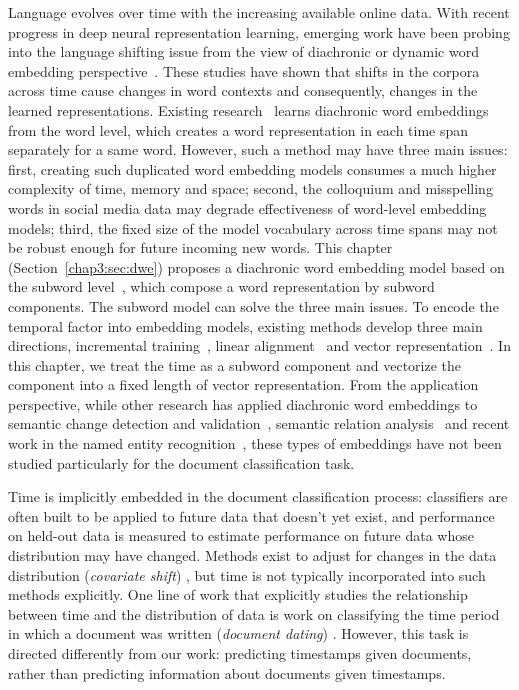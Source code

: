 Language evolves over time with the increasing available online data. 
With recent progress in deep neural representation learning, emerging work have been probing into the language shifting issue from the view of diachronic or dynamic word embedding perspective~\cite{tang2018state, kutuzov2018diachronic}.
These studies have shown that shifts in the corpora across time cause changes in word contexts and consequently, changes in the learned representations. 
Existing research~\cite{kim2014temporal, hamilton2016diachronic, yao2018dynamic, kutuzov2018diachronic} learns diachronic word embeddings from the word level, which creates a word representation in each time span separately for a same word. However, such a method may have three main issues: first, creating such duplicated word embedding models consumes a much higher complexity of time, memory and space; second, the colloquium and misspelling words in social media data may degrade effectiveness of word-level embedding models; third, the fixed size of the model vocabulary across time spans may not be robust enough for future incoming new words.
This chapter (Section~\ref{chap3:sec:dwe}) proposes a diachronic word embedding model based on the subword level~\cite{huang2019neural}, which compose a word representation by subword components. The subword model can solve the three main issues.
To encode the temporal factor into embedding models, existing methods develop three main directions, incremental training~\cite{kim2014temporal}, linear alignment~\cite{kulkarni2015statistically, hamilton2016diachronic} and vector representation~\cite{rosenfeld2018deep, huang2019neural}.
In this chapter, we treat the time as a subword component and vectorize the component into a fixed length of vector representation.
From the application perspective, while other research has applied diachronic word embeddings to semantic change detection and validation~\cite{mihalcea2012word, kim2014temporal, kulkarni2015statistically, hamilton2016diachronic, dubossarsky2017outta, yao2018dynamic, rudolph2018dynamic, rosenfeld2018deep, hu2019diachronic}, semantic relation analysis~\cite{liao2016analysing, szymanski2017temporal, rosin2017learning} and recent work in the named entity recognition~\cite{rijhwani2020temporally}, these types of embeddings have not been studied particularly for the document classification task.

Time is implicitly embedded in the document classification process: 
classifiers are often built to be applied to future data that doesn't yet exist,
and performance on held-out data is measured to estimate performance on future data whose distribution may have changed.
Methods exist to adjust for changes in the data distribution ({\em covariate shift}) \cite{SHIMODAIRA2000227,Bickel09},
but time is not typically incorporated into such methods explicitly.
One line of work that explicitly studies the relationship between time and the distribution of data is work on classifying the time period in which a document was written ({\em document dating}) \cite{Kanhabua08,Chambers:2012:LDT:2390524.2390539,Kotsakos:2014:BAD:2600428.2609495}.
However, this task is directed differently from our work: predicting timestamps given documents, rather than predicting information about documents given timestamps.


